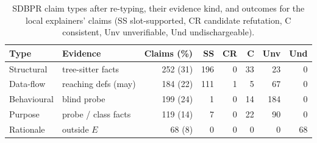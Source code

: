 \begin{table}[t]
\centering
\caption{SDBPR claim types after re-typing, their evidence kind, and \attest{} outcomes for the local explainers' claims (SS slot-supported, CR candidate refutation, C consistent, Unv unverifiable, Und undischargeable).}
\label{tab:typology}
\footnotesize\setlength{\tabcolsep}{2.4pt}
\begin{tabular}{@{}llrrrrrr@{}}
\toprule
Type & Evidence & Claims (\%) & SS & CR & C & Unv & Und \\
\midrule
Structural & tree-sitter facts & 252 (31) & 196 & 0 & 33 & 23 & 0 \\
Data-flow & reaching defs (may) & 184 (22) & 111 & 1 & 5 & 67 & 0 \\
Behavioural & blind probe & 199 (24) & 1 & 0 & 14 & 184 & 0 \\
Purpose & probe / class facts & 119 (14) & 7 & 0 & 22 & 90 & 0 \\
Rationale & outside $E$ & 68 (8) & 0 & 0 & 0 & 0 & 68 \\
\bottomrule
\end{tabular}
\end{table}
